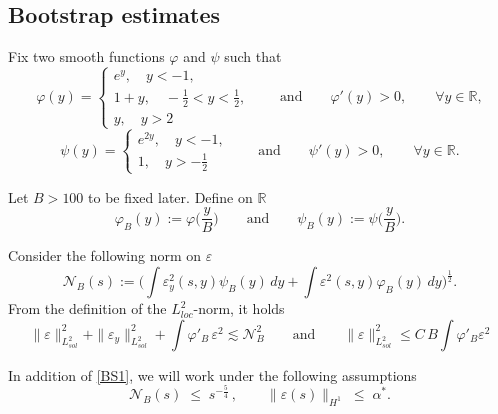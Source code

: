 \documentclass[16pt,english, oneside,reqno]{smfart}
\newcommand{\RR}{\mathbb{R}}
\newcommand{\vare}{{\varepsilon}}
\newcommand{\vphi}{{\varphi}}
\begin{document}
 





\subsection{Bootstrap estimates}
Fix two smooth functions $\vphi$ and $\psi$ such that
\begin{equation}
    \vphi(y)=\begin{cases}
        e^y, \quad y<-1,\\
        1+y, \quad -\frac{1}{2}<y<\frac{1}{2},\\
        y,  \quad y>2
    \end{cases}
    \qquad \text{and} \qquad \vphi'(y)>0, \qquad \forall y \in \RR,
\end{equation}
\begin{equation}
    \psi(y) = \begin{cases}
        e^{2y}, \quad y<-1,\\
        1, \quad y>-\frac{1}{2}
    \end{cases}
    \qquad \text{and} \qquad \psi'(y)>0, \qquad \forall y \in \RR.
\end{equation}

Let $B>100$ to be fixed later. Define on $\RR$
\begin{equation}
    \vphi_B(y):= \vphi\Big(\frac{y}{B} \Big) \qquad \text{and}\qquad \psi_B(y):= \psi\Big(\frac{y}{B} \Big).
\end{equation}

Consider the following norm on $\vare$
\begin{equation}
    \mathcal{N}_B(s):= \Big(\int\vare_y^2(s,y)\psi_B(y) \,dy + \int\vare^2(s,y)\vphi_B(y) \,dy \Big)^{\frac{1}{2}}.
\end{equation}
From the definition of the $L^2_{loc}$-norm, it holds
\begin{equation}\label{relation_L2loc_with_N_B}
    \|\vare\|^2_{L^2_{sol}}+ \|\vare_y\|^2_{L^2_{sol}} + \int \vphi'_B\,\vare^2  \lesssim \mathcal{N}^2_B
    \qquad\text{and}\qquad \|\vare\|^2_{L^2_{sol}} \leq  C\,B\int \vphi'_B \vare^2 
\end{equation}

In addition of \eqref{BS1}, we will work under the following assumptions
\begin{equation}\tag{BS2}\label{BS2}
        \mathcal{N}_B(s) \;\leq\; s^{-\frac{5}{4}}\,, \qquad \|\vare(s)\|_{H^1} \;\leq\; \alpha^*. 
\end{equation}
\end{document}
